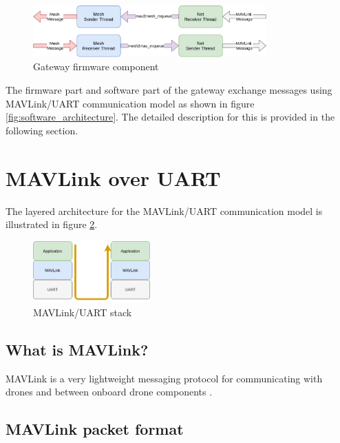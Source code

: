 \documentclass[\main/main.tex]{subfiles}
\begin{document}
\begin{figure}[H]
    \begin{center}
        \includegraphics[width=0.8\textwidth]{gateway_firmware.png}
    \end{center}
    \caption{Gateway firmware component}
    \label{fig:gateway_firmware}
\end{figure}

The firmware part and software part of the gateway exchange messages using MAVLink/UART communication model as shown in figure \ref{fig:software_architecture}. The detailed description for this is provided in the following section.

\section{MAVLink over UART}
The layered architecture for the MAVLink/UART communication model is illustrated in figure \ref{fig:mavlink_uart_stack}.
\begin{figure}[H]
    \begin{center}
        \includegraphics[width=0.4\textwidth]{MAVLink_over_UART.png}
    \end{center}
    \caption{MAVLink/UART stack}
    \label{fig:mavlink_uart_stack}
\end{figure}

\subsection{What is MAVLink?}
MAVLink is a very lightweight messaging protocol for communicating with drones and between onboard drone components \cite{web_mavlink}.

\subsection{MAVLink packet format}
\end{document}
